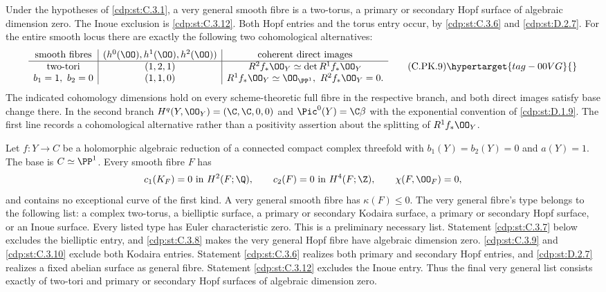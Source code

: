
\begin{proposition}\hypertarget{tag-01F6}{}\label{cdp:st:C.3.11}



Under the hypotheses of \ref{cdp:st:C.3.1}, a very general smooth fibre
is a two-torus, a primary or secondary Hopf surface of
algebraic dimension zero. The Inoue exclusion is \ref{cdp:st:C.3.12}.
Both Hopf
entries and the torus entry occur, by \ref{cdp:st:C.3.6} and \ref{cdp:st:D.2.7}.
For the entire smooth locus there are exactly the following
two cohomological alternatives:
\[
\begin{array}{c|c|c}
\text{smooth fibres}&
 (h^0(\OO),h^1(\OO),h^2(\OO))&
 \text{coherent direct images}\\ \hline
\text{two-tori}&(1,2,1)&
 R^2f_*\OO_Y\simeq\det R^1f_*\OO_Y\\
b_1=1,\ b_2=0&(1,1,0)&
 R^1f_*\OO_Y\simeq\OO_{\PP^1},\
 R^2f_*\OO_Y=0 .
\end{array}
\tag{C.PK.9}\hypertarget{tag-00VG}{}\label{cdp:eq:C.PK.9}
\]
The indicated cohomology dimensions hold on every
scheme-theoretic full fibre in the respective branch,
and both direct images satisfy base change there.
In the second branch
$H^q(Y,\OO_Y)=(\C,\C,0,0)$ and
$\Pic^0(Y)=\C\beta$ with the exponential convention
of \ref{cdp:st:D.1.9}. The first line records a cohomological
alternative rather than a positivity assertion about
the splitting of $R^1f_*\OO_Y$.
\end{proposition}

\begin{proposition}\hypertarget{tag-01F4}{}\label{cdp:st:C.3.1}


Let $f:Y\to C$ be a holomorphic algebraic reduction of a connected
compact complex threefold with $b_1(Y)=b_2(Y)=0$ and $a(Y)=1$.
The base is $C\simeq\PP^1$. Every smooth fibre $F$ has
\[
 c_1(K_F)=0\text{ in }H^2(F;\Q),\qquad
 c_2(F)=0\text{ in }H^4(F;\Z),\qquad
 \chi(F,\OO_F)=0,
\]
and contains no exceptional curve of the first kind. A very general
smooth fibre has $\kappa(F)\leq0$. The very general fibre's type belongs to the following
list: a complex two-torus, a bielliptic surface, a primary or secondary
Kodaira surface, a primary or secondary Hopf surface, or an Inoue
surface. Every listed type has Euler characteristic zero. This is a
preliminary necessary list. Statement \ref{cdp:st:C.3.7} below excludes the
bielliptic entry, and \ref{cdp:st:C.3.8} makes the very general Hopf fibre have
algebraic dimension zero. \ref{cdp:st:C.3.9} and \ref{cdp:st:C.3.10} exclude both Kodaira
entries. Statement \ref{cdp:st:C.3.6} realizes both primary and secondary Hopf
entries, and \ref{cdp:st:D.2.7} realizes a fixed abelian surface as general
fibre. Statement \ref{cdp:st:C.3.12} excludes the Inoue entry. Thus the
final very general list consists exactly of two-tori and
primary or secondary Hopf surfaces of algebraic dimension zero.
\end{proposition}

